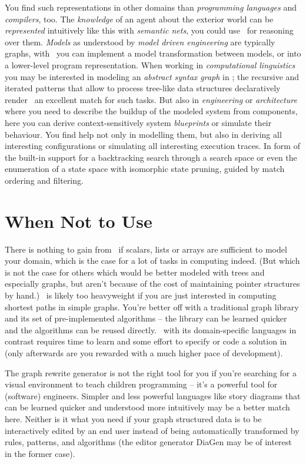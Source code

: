 You find such representations in other domains than \emph{programming languages} and \emph{compilers}, too.
The \emph{knowledge} of an agent about the exterior world can be \emph{represented} intuitively like this with \emph{semantic nets}, you could use \GrG\ for reasoning over them.
\emph{Models} as understood by \emph{model driven engineering} are typically graphs, with \GrG\ you can implement a model transformation between models, or into a lower-level program representation.
When working in \emph{computational linguistics} you may be interested in modeling an \emph{abstract syntax graph} in \GrG;
the recursive and iterated patterns that allow to process tree-like data structures declaratively render \GrG\ an excellent match for such tasks.
But also in \emph{engineering} or \emph{architecture} where you need to describe the buildup of the modeled system from components, here you can derive context-sensitively system \emph{blueprints} or simulate their behaviour.
You find help not only in modelling them, but also in deriving all interesting configurations or simulating all interesting execution traces. 
In form of the built-in support for a backtracking search through a search space or even the enumeration of a state space with isomorphic state pruning, guided by match ordering and filtering.


\section{When Not to Use \GrG}
There is nothing to gain from \GrG\ if scalars, lists or arrays are sufficient to model your domain,
which is the case for a lot of tasks in computing indeed.
(But which is not the case for others which would be better modeled with trees and especially graphs,
but aren't because of the cost of maintaining pointer structures by hand.)
\GrG\ is likely too heavyweight if you are just interested in computing shortest paths in simple graphs.
You're better off with a traditional graph library and its set of pre-implemented algorithms --
the library can be learned quicker and the algorithms can be reused directly.
\GrG\ with its domain-specific languages in contrast requires time to learn and some effort to specify or code a solution in (only afterwards are you rewarded with a much higher pace of development).

The graph rewrite generator is not the right tool for you if you're searching for a visual environment to teach children programming -- it's a powerful tool for (software) engineers.
Simpler and less powerful languages like story diagrams\cite{storydiagrams} that can be learned quicker and understood more intuitively may be a better match here.
Neither is it what you need if your graph structured data is to be interactively edited by an end user instead of being automatically transformed by rules, patterns, and algorithms (the editor generator DiaGen\cite{diagen} may be of interest in the former case).

